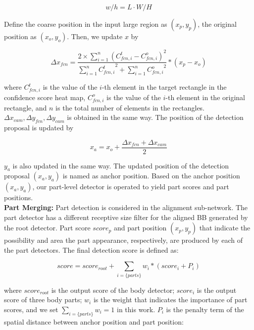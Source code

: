 \documentclass[journal]{IEEEtran}
\begin{document}
\begin{equation}
w/h=L\cdot W/H
\end{equation}

Define the coarse position in the input large region as $(x_p, y_p)$, the original position as $(x_o, y_o)$.
Then, we update $x$ by

\begin{equation}
\Delta{x}_{fcn}=\frac{2\times\sum_{i=1}^{n} (C_{fcn,i}^{t}-C_{fcn,i}^{o})^{2}}{\sum_{i=1}^n {C_{fcn,i}^{t}}^{2}+\sum_{i=1}^{n}{C_{fcn,i}^{o}}^{2}}\ast (x_{p}-x_{o})
\end{equation}

where $C_{fcn,i}^{t}$ is the value of the $i$-th element in the target rectangle in the confidence score heat map, $C_{fcn,i}^{o}$ is the value of the $i$-th element in the original rectangle, and $n$ is the total number of elements in the rectangles. $\Delta{x}_{cam}, \Delta{y}_{fcn},\Delta{y}_{cam} $ is obtained in the same way. The position of the detection proposal is updated by

\begin{equation}
x_a=x_o+\frac{\Delta{x}_{fcn}+\Delta{x}_{cam}}{2}
\end{equation}

$y_a$ is also updated in the same way. The updated position of the detection proposal $(x_a, y_a)$ is named as anchor position. Based on the anchor position $(x_a, y_a)$, our part-level detector is operated to yield part scores and part positions. \\

\textbf{Part Merging:} Part detection is considered in the alignment sub-network. The part detector has a different receptive size filter for the aligned BB generated by the root detector. Part score $score_p$ and part position $(x_p, y_p)$ that indicate the possibility and area the part appearance, respectively, are produced by each of the part detectors. The final detection score is defined as:

\begin{equation}
score = score_{root}+\sum_{i=\{parts\}}{w_i}\ast(score_i + P_i)
\end{equation}

where $score_{root}$ is the output score of the body detector; $score_i$ is the output score of three body parts; $w_i$ is the weight that indicates the importance of part scores, and we set $\sum_{i=\{parts\}}w_{i}=1$ in this work. $P_i$ is the penalty term of the spatial distance between anchor position and part position:
\end{document}
